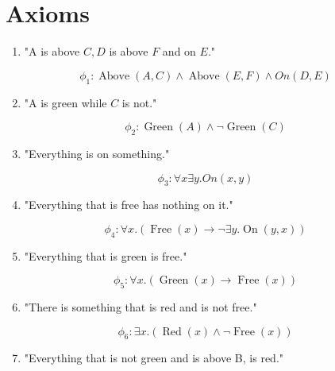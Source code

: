 \documentclass[10pt]{article}
\begin{document}
\captionsetup{singlelinecheck=false}
\section{Axioms}
\begin{enumerate}
  \item "A is above $C, D$ is above $F$ and on $E$."
\end{enumerate}

$$
\phi_{1}: \operatorname{Above}(A, C) \wedge \operatorname{Above}(E, F) \wedge O n(D, E)
$$

\begin{enumerate}
  \setcounter{enumi}{1}
  \item "A is green while $C$ is not."
\end{enumerate}

$$
\phi_{2}: \operatorname{Green}(A) \wedge \neg \operatorname{Green}(C)
$$

\begin{enumerate}
  \setcounter{enumi}{2}
  \item "Everything is on something."
\end{enumerate}

$$
\phi_{3}: \forall x \exists y . O n(x, y)
$$

\begin{enumerate}
  \setcounter{enumi}{3}
  \item "Everything that is free has nothing on it."
\end{enumerate}

$$
\phi_{4}: \forall x .(\operatorname{Free}(x) \rightarrow \neg \exists y . \operatorname{On}(y, x))
$$

\begin{enumerate}
  \setcounter{enumi}{4}
  \item "Everything that is green is free."
\end{enumerate}

$$
\phi_{5}: \forall x .(\operatorname{Green}(x) \rightarrow \operatorname{Free}(x))
$$

\begin{enumerate}
  \setcounter{enumi}{5}
  \item "There is something that is red and is not free."
\end{enumerate}

$$
\phi_{6}: \exists x .(\operatorname{Red}(x) \wedge \neg \operatorname{Free}(x))
$$

\begin{enumerate}
  \setcounter{enumi}{6}
  \item "Everything that is not green and is above B, is red."
\end{enumerate}
\end{document}
